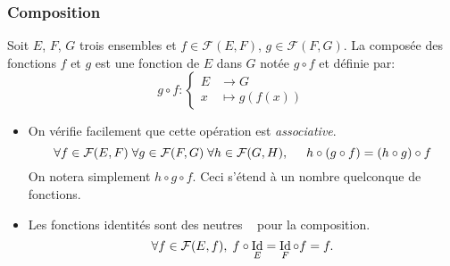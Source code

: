 \subsubsection{Composition}
\begin{defi}
 Soit $E$, $F$, $G$ trois ensembles et $f\in \mathcal{F}(E,F)$, $g\in \mathcal{F}(F,G)$. La composée des fonctions $f$ et $g$ est une fonction de $E$ dans $G$ notée $g \circ f$ et définie par:
\begin{displaymath}
 g \circ f:
\left\lbrace 
\begin{aligned}
 E &\rightarrow G \\ x &\mapsto g(f(x))
\end{aligned}
\right. 
\end{displaymath}
\end{defi}
\begin{rems}
 \begin{itemize}
  \item On vérifie facilement que cette opération est \emph{associative}.
\begin{displaymath}
 \forall f\in \mathcal{F}(E,F)\;\forall g\in \mathcal{F}(F,G)\;\forall h\in \mathcal{F}(G,H),
\hspace{0.5cm}
h \circ (g\circ f) = (h \circ g)\circ f
\end{displaymath}
On notera simplement $h\circ g \circ f$. Ceci s'étend à un nombre quelconque de fonctions.
  \item Les fonctions identités sont des  neutres \fg~ pour la composition.
\begin{displaymath}
\forall f\in \mathcal{F}(E,f),\; f \circ \mathop{\mathrm{Id}}_E = \mathop{\mathrm{Id}}_F \circ f = f.
\end{displaymath}
 \end{itemize}
\end{rems}


